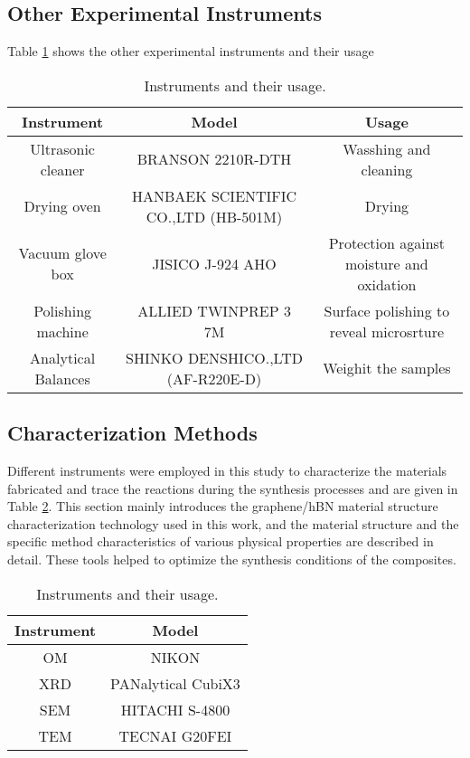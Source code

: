 \subsection{Other Experimental Instruments}

Table \ref{tab:Other Experimental Instruments} shows the other experimental instruments and their usage
\begin{table}[!htb]
\centering
\caption{Instruments and their usage.}
\resizebox{\linewidth}{!}
{
\begin{tabular}{ccc}
\hline
Instrument          & Model                                 & Usage                      \\ \hline
Ultrasonic cleaner  & BRANSON  2210R-DTH                    & Wasshing and cleaning         \\
Drying oven         & HANBAEK SCIENTIFIC CO.,LTD  (HB-501M) & Drying \\
Vacuum glove box    & JISICO  J-924 AHO                     & Protection against moisture and oxidation \\
Polishing machine   & ALLIED TWINPREP 3 7M                  & Surface polishing to reveal microsrture \\
Analytical Balances & SHINKO DENSHICO.,LTD  (AF-R220E-D)    & Weighit the samples \\ \hline
\end{tabular}
}
\label{tab:Other Experimental Instruments}
\end{table}
\subsection{Characterization Methods}
Different instruments were employed in this study to characterize the materials fabricated and trace the reactions during the synthesis processes and are given in Table \ref{tab:characterization}. This section mainly introduces the graphene/hBN material structure characterization technology used in this work, and the material structure and the specific method characteristics of various physical properties are described in detail. These tools helped to optimize the synthesis conditions of the composites. 

\begin{table}[!htb]
\centering
\caption{Instruments and their usage.}
{
\begin{tabular}{cc}
\hline
Instrument & Model              \\ \hline
OM         & NIKON              \\
XRD        & PANalytical CubiX3 \\
SEM        & HITACHI S-4800     \\
TEM        & TECNAI G20FEI      \\ \hline
\end{tabular}
}
\label{tab:characterization}
\end{table}

